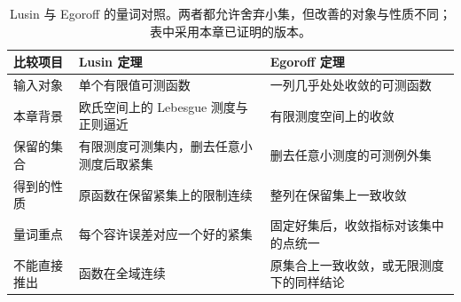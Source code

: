 \begin{table}[htbp]
\centering\small\renewcommand{\arraystretch}{1.18}\setlength{\tabcolsep}{4pt}
\caption[Lusin 与 Egoroff 的量词对照]{Lusin 与 Egoroff 的量词对照。两者都允许舍弃小集，但改善的对象与性质不同；表中采用本章已证明的版本。}
\label{b1:tab:visual-t03}
\begin{tabularx}{\linewidth}{@{}>{\raggedright\arraybackslash}p{3.1cm}>{\raggedright\arraybackslash}p{4.7cm}>{\raggedright\arraybackslash}X@{}}
\toprule
比较项目 & Lusin 定理 & Egoroff 定理 \\
\midrule
输入对象 & 单个有限值可测函数 & 一列几乎处处收敛的可测函数 \\
本章背景 & 欧氏空间上的 Lebesgue 测度与正则逼近 & 有限测度空间上的收敛 \\
保留的集合 & 有限测度可测集内，删去任意小测度后取紧集 & 删去任意小测度的可测例外集 \\
得到的性质 & 原函数在保留紧集上的限制连续 & 整列在保留集上一致收敛 \\
量词重点 & 每个容许误差对应一个好的紧集 & 固定好集后，收敛指标对该集中的点统一 \\
不能直接推出 & 函数在全域连续 & 原集合上一致收敛，或无限测度下的同样结论 \\
\bottomrule
\end{tabularx}
\end{table}
